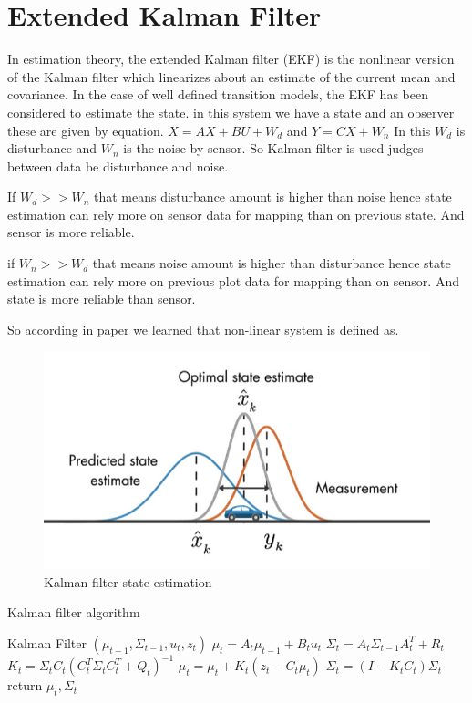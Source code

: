 \section{Extended Kalman Filter}
\label{ekf_section}

In estimation theory, the extended Kalman filter (EKF) is the nonlinear version of the Kalman filter which linearizes about an estimate of the current mean and covariance. In the case of well defined transition models, the EKF has been considered to estimate the state. 
in this system we have a state and an observer these are given by equation.
$ X=AX +BU + W_d $  and $ Y=CX + W_n $
In this $ W_d $ is disturbance and $ W_n $ is the noise by sensor.
So Kalman filter is used judges between data be disturbance and noise.


If $W_d >> W_n$ that means disturbance amount is higher than noise hence state estimation can rely more on sensor data for mapping than on previous state. And sensor is more reliable.

if $W_n >> W_d$ that means noise amount is higher than disturbance hence state estimation can rely more on previous plot data for mapping than on sensor. And state is more reliable than sensor.

So according in paper we learned that non-linear system is defined as.

\begin{figure}[!htb]
\includegraphics[width=\textwidth]{./figures/EKF.jpg}
\caption{Kalman filter state estimation~\cite{ByBo2015} }
\end{figure}

\begin{algorithm}
\caption{Kalman filter algorithm}\label{alg-gd}
\begin{algorithmic}[1]
\STATE Kalman Filter \({(\mu_{t-1},\Sigma_{t-1},u_t,z_t)}\)
\STATE \( {\mu_{t}}=A_t \mu_{t-1} + B_t u_t \)
\STATE \( \Sigma_{t}=A_t \Sigma_{t-1} A_t^T +R_t\)
\STATE \( K_t = \Sigma_{t} C_t(C_t^T \Sigma_{t}C_t^T+Q_t)^{-1}\)
\STATE \( \mu_{t}=\mu_{t}+K_t(z_t-C_t \mu_t) \)
\STATE \(\Sigma_{t}=(I-K_t C_t)\Sigma_{t}\)
\STATE return \( \mu_t ,  \Sigma_t \)
\end{algorithmic}
\end{algorithm}

